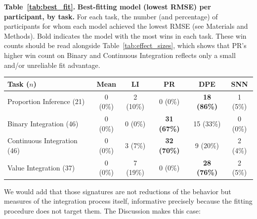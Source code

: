 \vspace{0.6em}
\noindent\begin{minipage}{\textwidth}\color{mscap}\scriptsize
{\textbf{Table~\ref{tab:best_fit}.} \textbf{Best-fitting model (lowest RMSE) per participant, by task.} For each task, the number (and percentage) of participants for whom each model achieved the lowest RMSE (see Materials and Methods). Bold indicates the model with the most wins in each task. These win counts should be read alongside Table~\ref{tab:effect_sizes}, which shows that PR's higher win count on Binary and Continuous Integration reflects only a small and/or unreliable fit advantage.\par}
\vspace{0.4em}
\begin{center}
\begin{tabular}{lccccc}
		\hline
		Task ($n$) & Mean & LI & PR & DPE & SNN \\
		\hline
		Proportion Inference (21) & 0 (0\%) & 2 (10\%) & 0 (0\%) & \textbf{18 (86\%)} & 1 (5\%) \\
		Binary Integration (46) & 0 (0\%) & 0 (0\%) & \textbf{31 (67\%)} & 15 (33\%) & 0 (0\%) \\
		Continuous Integration (46) & 0 (0\%) & 3 (7\%) & \textbf{32 (70\%)} & 9 (20\%) & 2 (4\%) \\
		Value Integration (37) & 0 (0\%) & 7 (19\%) & 0 (0\%) & \textbf{28 (76\%)} & 2 (5\%) \\
		\hline
	\end{tabular}
\end{center}
\end{minipage}
\vspace{0.8em}

We would add that those signatures are not reductions of the behavior but measures of the integration process itself, informative precisely because the fitting procedure does not target them. The Discussion makes this case:

